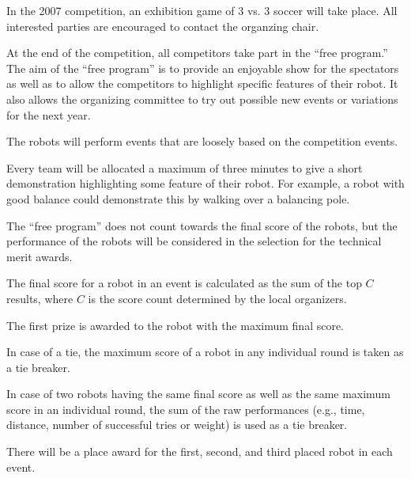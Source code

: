 \documentclass[12pt]{hurocup}
\begin{document}
\begin{decisions}
\item In the 2007 competition, an exhibition game of 3 vs. 3 soccer
will take place. All interested parties are encouraged to contact the
organzing chair.
\end{decisions}


\begin{lawlist}[ORG]
  
\item At the end of the competition, all competitors take part in the
 ``free program.'' The aim of the ``free program'' is to provide an
 enjoyable show for the spectators as well as to allow the competitors
 to highlight specific features of their robot. It also allows the
 organizing committee to try out possible new events or variations for
 the next year.
  
\item The robots will perform events that are loosely based on the
 competition events. 
  
\item Every team will be allocated a maximum of three minutes to give
 a short demonstration highlighting some feature of their robot. For
 example, a robot with good balance could demonstrate this by walking
 over a balancing pole.
  
\item The ``free program'' does not count towards the final score of
 the robots, but the performance of the robots will be considered in
 the selection for the technical merit awards.

\end{lawlist}


\begin{lawlist}[ORG]
  
\item The final score for a robot in an event is calculated as the sum of 
 the top $C$ results, where $C$ is the score count determined by the local
 organizers.
  
\item The first prize is awarded to the robot with the maximum final score.
  
\item In case of a tie, the maximum score of a robot in any individual
  round is taken as a tie breaker.
  
\item In case of two robots having the same final score as well as the
 same maximum score in an individual round, the sum of the raw
 performances (e.g., time, distance, number of successful tries or
 weight) is used as a tie breaker.

\item There will be a place award for the first, second, and third
  placed robot in each event.

\end{lawlist}
\end{document}
